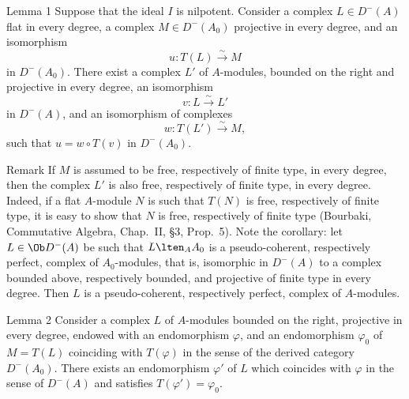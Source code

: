 \begin{statement}{Lemma 1}
Suppose that the ideal $I$ is nilpotent. Consider a complex $L\in D^-(A)$ flat in every degree, a complex $M\in D^-(A_0)$ projective in every degree, and an isomorphism
\[
u:T(L)\xrightarrow{\sim}M
\]
in $D^-(A_0)$. There exist a complex $L'$ of $A$-modules, bounded on the right and projective in every degree, an isomorphism
\[
v:L\xrightarrow{\sim}L'
\]
in $D^-(A)$, and an isomorphism of complexes
\[
w:T(L')\xrightarrow{\sim}M,
\]
such that $u=w\circ T(v)$ in $D^-(A_0)$.
\end{statement}

\begin{statement}{Remark}
If $M$ is assumed to be free, respectively of finite type, in every degree, then the complex $L'$ is also free, respectively of finite type, in every degree. Indeed, if a flat $A$-module $N$ is such that $T(N)$ is free, respectively of finite type, it is easy to show that $N$ is free, respectively of finite type (Bourbaki, Commutative Algebra, Chap.~II, §3, Prop.~5). Note the corollary: let $L\in\Ob D^-(A)$ be such that $L\lten_A A_0$ is a pseudo-coherent, respectively perfect, complex of $A_0$-modules, that is, isomorphic in $D^-(A)$ to a complex bounded above, respectively bounded, and projective of finite type in every degree. Then $L$ is a pseudo-coherent, respectively perfect, complex of $A$-modules.
\end{statement}

\begin{statement}{Lemma 2}
Consider a complex $L$ of $A$-modules bounded on the right, projective in every degree, endowed with an endomorphism $\varphi$, and an endomorphism $\varphi_0$ of $M=T(L)$ coinciding with $T(\varphi)$ in the sense of the derived category $D^-(A_0)$. There exists an endomorphism $\varphi'$ of $L$ which coincides with $\varphi$ in the sense of $D^-(A)$ and satisfies $T(\varphi')=\varphi_0$.
\end{statement}

